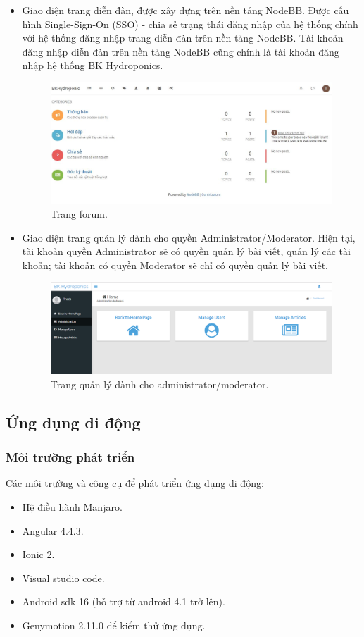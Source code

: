 \documentclass[a4paper,12pt,oneside]{article}
\begin{document}
\begin{itemize}
\item Giao diện trang diễn đàn, được xây dựng trên nền tảng NodeBB. Được cấu hình Single-Sign-On (SSO) - chia sẻ trạng thái đăng nhập của hệ thống chính với hệ thống đăng nhập trang diễn đàn trên nền tảng NodeBB. Tài khoản đăng nhập diễn đàn trên nền tảng NodeBB cũng chính là tài khoản đăng nhập hệ thống BK Hydroponics.   
\begin{figure}[H]
\centering
\includegraphics[scale=.5]{hinh/web_forum.jpg}
\caption{Trang forum.}
\end{figure}

\item Giao diện trang quản lý dành cho quyền Administrator/Moderator. Hiện tại, tài khoản quyền Administrator sẽ có quyền quản lý bài viết, quản lý các tài khoản; tài khoản có quyền Moderator sẽ chỉ có quyền quản lý bài viết.
\begin{figure}[H]
\centering
\includegraphics[scale=.38]{hinh/admin_page.png}
\caption{Trang quản lý dành cho administrator/moderator.}
\end{figure}
\end{itemize}

\subsection{Ứng dụng di động}
\subsubsection{Môi trường phát triển}
Các môi trường và công cụ để phát triển ứng dụng di động:
\begin{itemize}
\item Hệ điều hành Manjaro.
\item Angular 4.4.3.
\item Ionic 2.
\item Visual studio code.
\item Android sdk 16 (hỗ trợ từ android 4.1 trở lên).
\item Genymotion 2.11.0 để kiểm thử ứng dụng.
\end{itemize}
\end{document}
